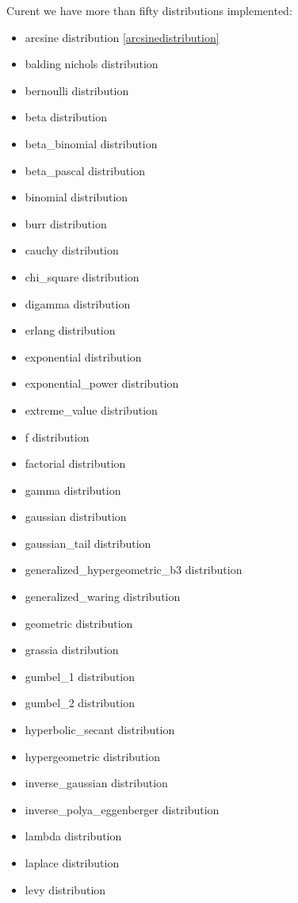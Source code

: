 Curent we have more than fifty distributions implemented:
\begin{itemize}
    \item arcsine distribution \ref{arcsinedistribution}
    \item balding nichols distribution
    \item bernoulli distribution
    \item beta distribution
    \item beta\_binomial distribution
    \item beta\_pascal distribution
    \item binomial distribution
    \item burr distribution
    \item cauchy distribution
    \item chi\_square distribution
    \item digamma distribution
    \item erlang distribution
    \item exponential distribution
    \item exponential\_power distribution
    \item extreme\_value distribution
    \item f distribution
    \item factorial distribution
    \item gamma distribution
    \item gaussian distribution
    \item gaussian\_tail distribution
    \item generalized\_hypergeometric\_b3 distribution
    \item generalized\_waring distribution
    \item geometric distribution
    \item grassia distribution
    \item gumbel\_1 distribution
    \item gumbel\_2 distribution
    \item hyperbolic\_secant distribution
    \item hypergeometric distribution
    \item inverse\_gaussian distribution
    \item inverse\_polya\_eggenberger distribution
    \item lambda distribution
    \item laplace distribution
    \item levy distribution

\end{itemize}

